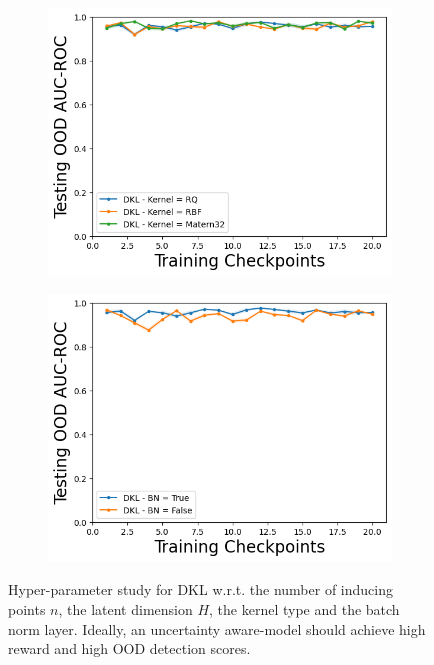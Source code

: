 \begin{figure}
\begin{subfigure}{.245\textwidth}
        \includegraphics[width=\textwidth]{sections/011_icml2022/resources/CartPoleOOD-v0-AUC-ROC-epistemic_-testing-hyperparameter-kernel-dkl.png}
    \end{subfigure}
        \begin{subfigure}{.245\textwidth}
        \includegraphics[width=\textwidth]{sections/011_icml2022/resources/CartPoleOOD-v0-AUC-ROC-epistemic_-testing-hyperparameter-bn-dkl.png}
    \end{subfigure}        
    \vspace{-3mm}
    \caption{Hyper-parameter study for DKL w.r.t. the number of inducing points $n$, the latent dimension $H$, the kernel type and the batch norm layer. Ideally, an uncertainty aware-model should achieve high reward and high OOD detection scores.}
    \label{fig:hyperparameter-dkl-cartpole}
    \vspace{-4mm}
\end{figure}